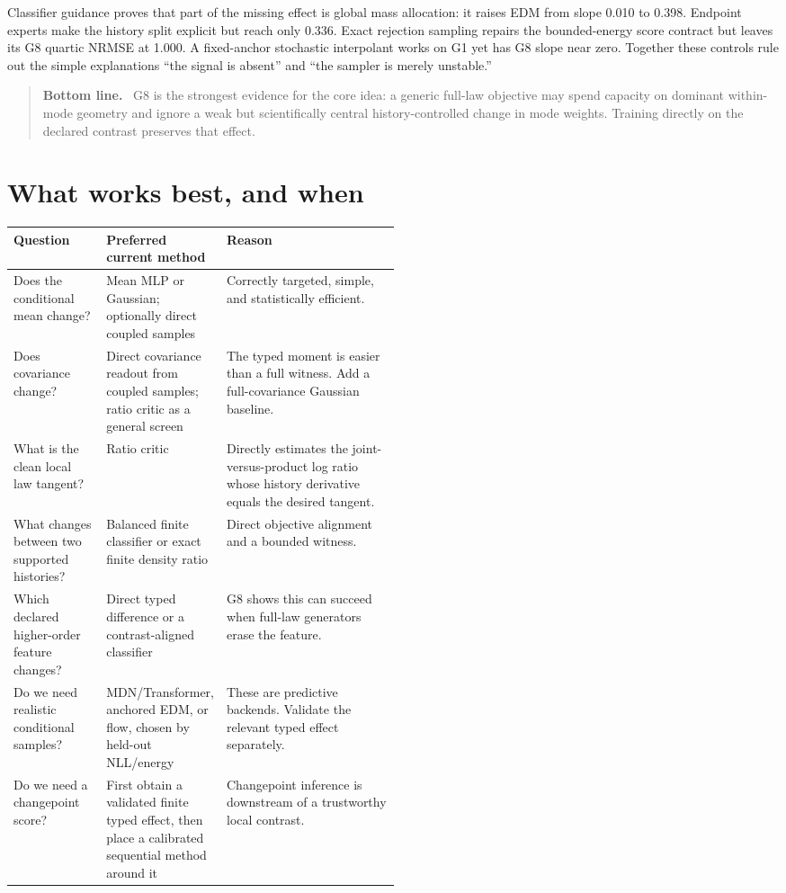 \documentclass[11pt]{article}
\newenvironment{bottomline}
  {\begin{quote}\color{sidblue}\textbf{Bottom line.}\ }
  {\end{quote}}
\begin{document}
Classifier guidance proves that part of the missing effect is global mass allocation:
it raises EDM from slope 0.010 to 0.398.  Endpoint experts make the history split
explicit but reach only 0.336.  Exact rejection sampling repairs the bounded-energy
score contract but leaves its G8 quartic NRMSE at 1.000.  A fixed-anchor stochastic
interpolant works on G1 yet has G8 slope near zero.  Together these controls rule out
the simple explanations ``the signal is absent'' and ``the sampler is merely
unstable.''

\begin{bottomline}
G8 is the strongest evidence for the core idea: a generic full-law objective may spend
capacity on dominant within-mode geometry and ignore a weak but scientifically central
history-controlled change in mode weights.  Training directly on the declared
contrast preserves that effect.
\end{bottomline}

\section{What works best, and when}

\begin{center}
\begin{tabularx}{\linewidth}{@{}p{0.24\linewidth} p{0.26\linewidth} X@{}}
\toprule
Question & Preferred current method & Reason \\
\midrule
Does the conditional mean change? & Mean MLP or Gaussian; optionally direct coupled
samples & Correctly targeted, simple, and statistically efficient. \\
Does covariance change? & Direct covariance readout from coupled samples; ratio critic
as a general screen & The typed moment is easier than a full witness.  Add a
full-covariance Gaussian baseline. \\
What is the clean local law tangent? & Ratio critic & Directly estimates the
joint-versus-product log ratio whose history derivative equals the desired tangent. \\
What changes between two supported histories? & Balanced finite classifier or exact
finite density ratio & Direct objective alignment and a bounded witness. \\
Which declared higher-order feature changes? & Direct typed difference or a
contrast-aligned classifier & G8 shows this can succeed when full-law generators erase
the feature. \\
Do we need realistic conditional samples? & MDN/Transformer, anchored EDM, or flow,
chosen by held-out NLL/energy & These are predictive backends.  Validate the relevant
typed effect separately. \\
Do we need a changepoint score? & First obtain a validated finite typed effect, then
place a calibrated sequential method around it & Changepoint inference is downstream
of a trustworthy local contrast. \\
\bottomrule
\end{tabularx}
\end{center}
\end{document}
